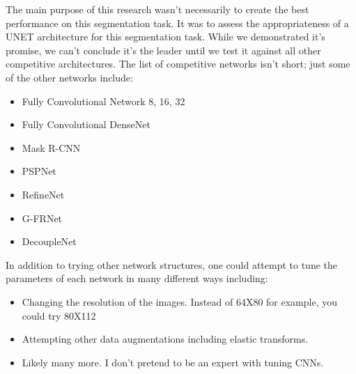 \documentclass[letterpaper]{article}
\begin{document}
The main purpose of this research wasn't necessarily to create the best performance on this segmentation task. It was to assess the appropriateness of a UNET architecture for this segmentation task. While we demonstrated it's promise, we can't conclude it's the leader until we test it against all other competitive architectures. The list of competitive networks isn't short; just some of the other networks include:
\begin{itemize}
  \item Fully Convolutional Network 8, 16, 32
  \item Fully Convolutional DenseNet
  \item Mask R-CNN
  \item PSPNet
  \item RefineNet
  \item G-FRNet
  \item DecoupleNet
  
  
\end{itemize}

In addition to trying other network structures, one could attempt to tune the parameters of each network in many different ways including:
\begin{itemize}
  \item Changing the resolution of the images. Instead of 64X80 for example, you could try 80X112
  \item Attempting other data augmentations including elastic transforms. 
  \item Likely many more. I don't pretend to be an expert with tuning CNNs.
  
\end{itemize}


\end{document}
